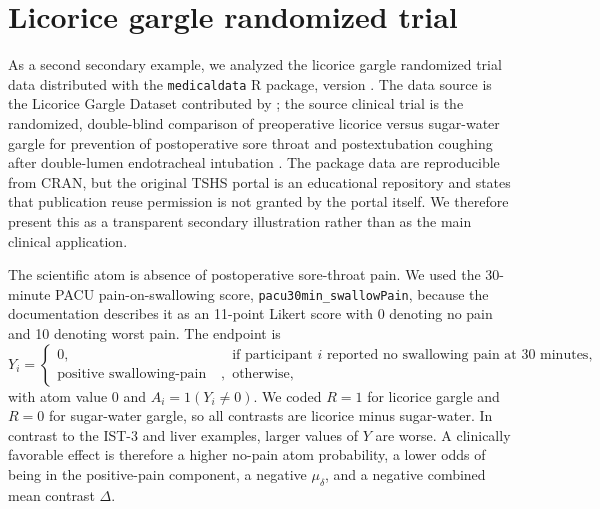 \documentclass[11pt]{article}
\begin{document}
\clearpage

\section{Licorice gargle randomized trial}\label{app:licorice-gargle-application}

As a second secondary example, we analyzed the licorice gargle randomized trial data distributed with the \texttt{medicaldata} R package, version \LicoriceAppendixPackageVersion{} \citep{medicaldataPackage}. The data source is the Licorice Gargle Dataset contributed by \citet{licoriceGargleDataset}; the source clinical trial is the randomized, double-blind comparison of preoperative licorice versus sugar-water gargle for prevention of postoperative sore throat and postextubation coughing after double-lumen endotracheal intubation \citep{ruetzler2013licorice}. The package data are reproducible from CRAN, but the original TSHS portal is an educational repository and states that publication reuse permission is not granted by the portal itself. We therefore present this as a transparent secondary illustration rather than as the main clinical application.

The scientific atom is absence of postoperative sore-throat pain. We used the 30-minute PACU pain-on-swallowing score, \texttt{pacu30min\_swallowPain}, because the documentation describes it as an 11-point Likert score with 0 denoting no pain and 10 denoting worst pain. The endpoint is
\[
Y_i =
\begin{cases}
0, & \text{if participant } i \text{ reported no swallowing pain at 30 minutes},\\
\text{positive swallowing-pain score}, & \text{otherwise},
\end{cases}
\]
with atom value 0 and $A_i = 1(Y_i \ne 0)$. We coded $R=1$ for licorice gargle and $R=0$ for sugar-water gargle, so all contrasts are licorice minus sugar-water. In contrast to the IST-3 and liver examples, larger values of $Y$ are worse. A clinically favorable effect is therefore a higher no-pain atom probability, a lower odds of being in the positive-pain component, a negative $\mu_\delta$, and a negative combined mean contrast $\Delta$.


\end{document}
